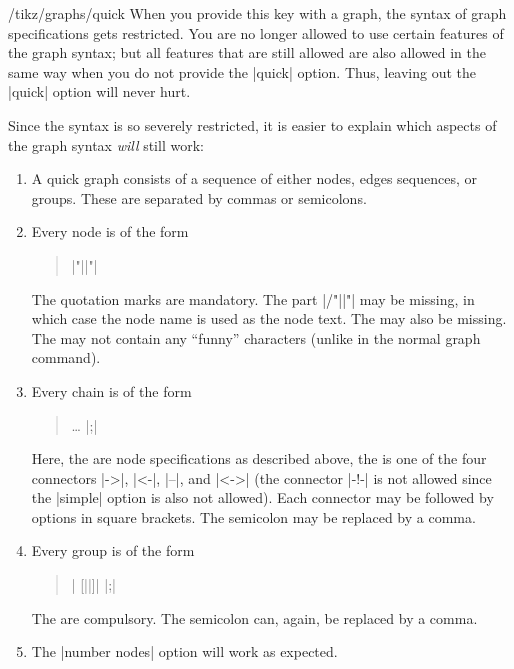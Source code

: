 \begin{key}{/tikz/graphs/quick}
    When you provide this key with a graph, the syntax of graph specifications
    gets restricted. You are no longer allowed to use certain features of the
    graph syntax; but all features that are still allowed are also allowed in
    the same way when you do not provide the |quick| option. Thus, leaving out
    the |quick| option will never hurt.

    Since the syntax is so severely restricted, it is easier to explain which
    aspects of the graph syntax \emph{will} still work:
    \begin{enumerate}
        \item A quick graph consists of a sequence of either nodes, edges
            sequences, or groups. These are separated by commas or semicolons.
        \item Every node is of the form
            \begin{quote}
                |"||"|
            \end{quote}

            The quotation marks are mandatory. The part |/"||"|
            may  be missing, in which case the node name is used as the node
            text. The  may also be missing. The 
            may not contain any ``funny'' characters (unlike in the normal
            graph command).
        \item Every chain is of the form
            \begin{quote}
                  
                 \dots {} |;|
            \end{quote}

            Here, the  are node specifications as described
            above, the  is one of the four connectors |->|,
            |<-|, |--|, and |<->| (the connector |-!-| is not allowed since the
            |simple| option is also not allowed). Each connector may be
            followed by options in square brackets. The semicolon may be
            replaced by a comma.
        \item Every group is of the form
            \begin{quote}
                |{ [||]|  |};|
            \end{quote}
            The  are compulsory. The semicolon can, again, be
            replaced by a comma.
        \item The |number nodes| option will work as expected.
    \end{enumerate}


\end{key}
